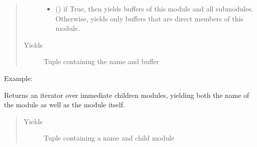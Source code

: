\documentclass[letterpaper,10pt,english]{sphinxmanual}
\begin{document}
\begin{fulllineitems}
\begin{fulllineitems}
\begin{quote}
\begin{description}
\begin{itemize}
\item {} 
 () \textendash{} if True, then yields buffers of this module
and all submodules. Otherwise, yields only buffers that
are direct members of this module.

\end{itemize}

\item[{Yields}] \leavevmode
{} \textendash{} Tuple containing the name and buffer

\end{description}\end{quote}

Example:

\begin{sphinxVerbatim}[commandchars=\\\{\}]
    
      \PYG{p}{[}\PYG{p}{]}
       
\end{sphinxVerbatim}

\end{fulllineitems}


\begin{fulllineitems}
\label{\detokenize{api/dynamics:geology.metamodelling.dynamics.LatentSpaceDynamics.named_children}}
Returns an iterator over immediate children modules, yielding both
the name of the module as well as the module itself.
\begin{quote}\begin{description}
\item[{Yields}] \leavevmode
{} \textendash{} Tuple containing a name and child module


\end{description}
\end{quote}
\end{fulllineitems}
\end{fulllineitems}
\end{document}
